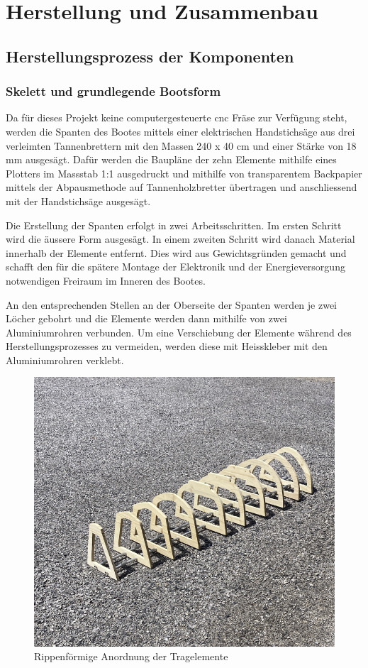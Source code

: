 \chapter{Herstellung und Zusammenbau}
\label{chap:herstllung}

\section{Herstellungsprozess der Komponenten}
\subsection{Skelett und grundlegende Bootsform}
Da für dieses Projekt keine computergesteuerte \ac{cnc} Fräse zur Verfügung steht, werden die Spanten des Bootes mittels einer elektrischen Handstichsäge aus drei verleimten Tannenbrettern mit den Massen 240 x 40 cm und einer Stärke von 18 mm ausgesägt. Dafür werden die Baupläne der zehn Elemente mithilfe eines Plotters im Massstab 1:1 ausgedruckt und mithilfe von transparentem Backpapier mittels der Abpausmethode auf Tannenholzbretter übertragen und anschliessend mit der Handstichsäge ausgesägt.

Die Erstellung der Spanten erfolgt in zwei Arbeitsschritten. Im ersten Schritt wird die äussere Form ausgesägt. In einem zweiten Schritt wird danach Material innerhalb der Elemente entfernt. Dies wird aus Gewichtsgründen gemacht und schafft den für die spätere Montage der Elektronik und der Energieversorgung notwendigen Freiraum im Inneren des Bootes.

An den entsprechenden Stellen an der Oberseite der Spanten werden je zwei Löcher gebohrt und die Elemente werden dann mithilfe von zwei Aluminiumrohren verbunden. Um eine Verschiebung der Elemente während des Herstellungsprozesses zu vermeiden, werden diese mit Heisskleber mit den Aluminiumrohren verklebt. 
\begin{figure}[H]
    \centering
    \includegraphics[width=1\linewidth]{rippe1.png}
    \caption{Rippenförmige Anordnung der Tragelemente}
    \label{fig:enter-label}
\end{figure}

